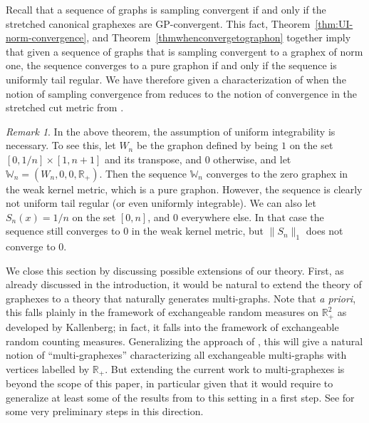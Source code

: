 \documentclass{amsart}
\numberwithin{equation}{section}
\numberwithin{figure}{section}
\theoremstyle{definition}
\theoremstyle{remark}
\newtheorem{remark}[theorem]{Remark}
\newcommand{\RR}{\mathbb{R}}
\newcommand{\cW}{\mathbb{W}}
\begin{document}
Recall that a sequence of graphs is sampling convergent if and only if the
stretched canonical graphexes are GP-convergent. This fact,
Theorem~\ref{thm:UI-norm-convergence}, and
Theorem~\ref{thmwhenconvergetographon} together imply that given a sequence
of graphs that is sampling convergent to a graphex of norm one, the sequence
converges to a pure graphon if and only if the sequence is uniformly tail
regular. We have therefore given a characterization of when the notion of
sampling convergence from \cite{BCCV17} reduces to the notion of convergence
in the stretched cut metric from \cite{BCCH16}.

\begin{remark}\label{rem:UI-is-needed}
In the above theorem, the assumption of uniform integrability is necessary.
To see this, let $W_n$ be the graphon defined by being $1$ on the set
$[0,1/n] \times [1,n+1]$ and its transpose, and $0$ otherwise, and let
$\cW_n=(W_n,0,0,\RR_+)$. Then the sequence $\cW_n$ converges to the zero
graphex in the weak kernel metric, which is a pure graphon. However, the
sequence is clearly not uniform tail regular (or even uniformly integrable).
We can also let $S_n(x)=1/n$ on the set $[0, n]$, and $0$ everywhere else. In
that case the sequence still converges to $0$ in the weak kernel metric, but
$\|S_n\|_1$ does not converge to $0$.
\end{remark}

We close this section by discussing possible extensions of our theory. First,
as already discussed in the introduction, it would be natural to extend the
theory of graphexes to a theory that naturally generates multi-graphs. Note
that \emph{a priori}, this falls plainly in the framework of exchangeable
random measures on $\RR_+^2$ as developed by Kallenberg; in fact, it falls
into the framework of exchangeable random counting measures. Generalizing the
approach of \cite{VR15,BCCH16}, this will give a natural notion of
``multi-graphexes'' characterizing all exchangeable multi-graphs with
vertices labelled by $\RR_+$. But extending the current work to
multi-graphexes is beyond the scope of this paper, in particular given that
it would require to generalize at least some of the results from
\cite{VR15,JANSON16,VR16,JANSON17,BCCV17} to this setting in a first step.
See \cite{BCDS18} for some very preliminary steps in this direction.
\end{document}
